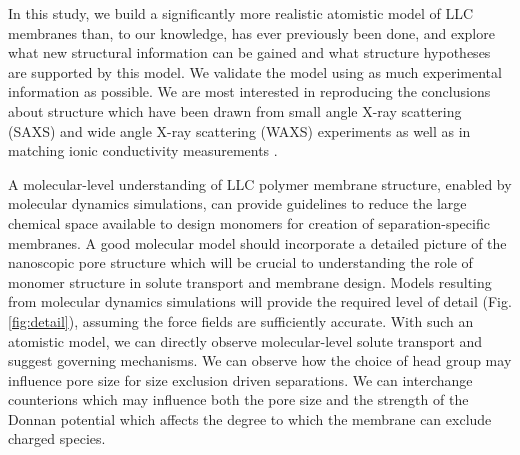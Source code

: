 \documentclass{article}
\begin{document}
  In this study, we build a significantly more realistic atomistic model of LLC
  membranes than, to our knowledge, has ever previously been done, and explore
  what new structural information can be gained and what structure hypotheses are
  supported by this model. We validate the model using as much experimental
  information as possible. We are most interested in reproducing the conclusions
  about structure which have been drawn from small angle X-ray scattering (SAXS)
  and wide angle X-ray scattering (WAXS) experiments as well as in matching ionic
  conductivity measurements \cite{feng_thin_2016}.

  A molecular-level understanding of LLC polymer membrane structure, enabled by
  molecular dynamics simulations, can provide guidelines to reduce the large
  chemical space available to design monomers for creation of separation-specific
  membranes. A good molecular model should incorporate a detailed picture of the
  nanoscopic pore structure which will be crucial to understanding the role of
  monomer structure in solute transport and membrane design. Models resulting
  from molecular dynamics simulations will provide the required level of detail
  (Fig. \ref{fig:detail}), assuming the force fields are sufficiently accurate.
  With such an atomistic model, we can directly observe molecular-level solute
  transport and suggest governing mechanisms. We can observe how the choice of
  head group may influence pore size for size exclusion driven separations. We
  can interchange counterions which may influence both the pore size and the
  strength of the Donnan potential which affects the degree to which the membrane
  can exclude charged species. 
\end{document}
